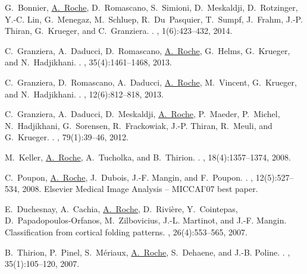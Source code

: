 \begin{thebibliography}{100}
G.~Bonnier, \underline{A.~Roche}, D.~Romascano, S.~Simioni, D.~Meskaldji, D.~Rotzinger,
  Y.-C. Lin, G.~Menegaz, M.~Schluep, R.~Du~Pasquier, T.~Sumpf, J.~Frahm, J.-P.
  Thiran, G.~Krueger, and C.~Granziera.
.
, 1(6):423--432,
  2014.

C.~Granziera, A.~Daducci, D.~Romascano, \underline{A.~Roche}, G.~Helms, G.~Krueger, and
  N.~Hadjikhani.
.
, 35(4):1461--1468, 2013.

C.~Granziera, D.~Romascano, A.~Daducci, \underline{A.~Roche}, M.~Vincent, G.~Krueger, and
  N.~Hadjikhani.
.
, 12(6):812--818, 2013.

C.~Granziera, A.~Daducci, D.~Meskaldji, \underline{A.~Roche}, P.~Maeder, P.~Michel,
  N.~Hadjikhani, G.~Sorensen, R.~Frackowiak, J.-P. Thiran, R.~Meuli, and
  G.~Krueger.
.
, 79(1):39--46, 2012.

M.~Keller, \underline{A.~Roche}, A.~Tucholka, and B.~Thirion.
.
, 18(4):1357--1374, 2008.

C.~Poupon, \underline{A.~Roche}, J.~Dubois, J.-F. Mangin, and F.~Poupon.
.
, 12(5):527--534, 2008.
\newblock Elsevier Medical Image Analysis -- MICCAI'07 best paper.

E.~Duchesnay, A.~Cachia, \underline{A.~Roche}, D.~Rivi\`ere, Y.~Cointepas,
  D.~Papadopoulos-Orfanos, M.~Zilbovicius, J.-L. Martinot, and J.-F. Mangin.
\newblock Classification from cortical folding patterns.
, 26(4):553--565, 2007.

B.~Thirion, P.~Pinel, S.~M\'eriaux, \underline{A.~Roche}, S.~Dehaene, and J.-B. Poline.
.
, 35(1):105--120, 2007.


\end{thebibliography}
